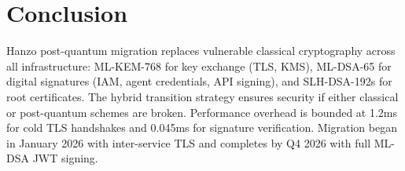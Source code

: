 \section{Conclusion}

\label{sec:conclusion}

Hanzo post-quantum migration replaces vulnerable classical cryptography across
all infrastructure: ML-KEM-768 for key exchange (TLS, KMS), ML-DSA-65 for
digital signatures (IAM, agent credentials, API signing), and SLH-DSA-192s for
root certificates. The hybrid transition strategy ensures security if either
classical or post-quantum schemes are broken. Performance overhead is bounded
at 1.2ms for cold TLS handshakes and 0.045ms for signature verification.
Migration began in January 2026 with inter-service TLS and completes by Q4
2026 with full ML-DSA JWT signing.

